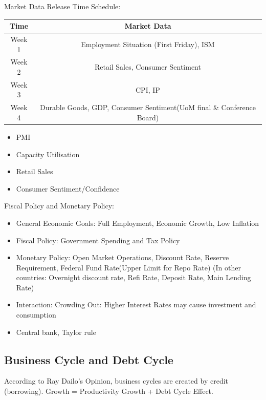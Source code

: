 \documentclass[11pt, openany]{book}              %
\begin{document}
Market Data Release Time Schedule:

\begin{center}
 \begin{tabular}{||c c||} 
 \hline
 Time & Market Data \\ [0.5ex] 
 \hline
 Week 1 & Employment Situation (First Friday), ISM \\ 
 Week 2 & Retail Sales, Consumer Sentiment \\ 
 Week 3 & CPI, IP \\ 
 Week 4 & Durable Goods, GDP, Consumer Sentiment(UoM final \& Conference Board) \\ 
 \hline
\end{tabular}
\end{center}

\begin{itemize}
    \item PMI 
    \item Capacity Utilisation 
    \item Retail Sales
    \item Consumer Sentiment/Confidence 
\end{itemize}
Fiscal Policy and Monetary Policy:

\begin{itemize}
	\item General Economic Goals: Full Employment, Economic Growth, Low Inflation
	\item Fiscal Policy: Government Spending and Tax Policy
    \item Monetary Policy: Open Market Operations, Discount Rate, Reserve Requirement, Federal Fund Rate(Upper Limit for Repo Rate) (In other countries: Overnight discount rate, Refi Rate, Deposit Rate, Main Lending Rate) 
    \item Interaction: Crowding Out: Higher Interest Rates may cause investment and consumption 
    \item Central bank, Taylor rule
\end{itemize}

\subsection{Business Cycle and Debt Cycle}

According to Ray Dailo's Opinion, business cycles are created by credit (borrowing). Growth = Productivity Growth + Debt Cycle Effect.  
\end{document}
